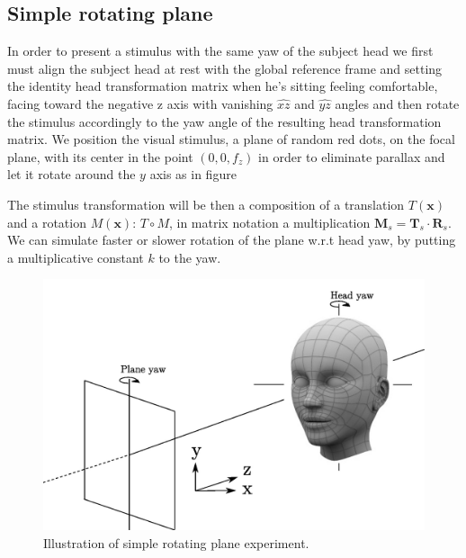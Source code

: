 \documentclass[acmtocl,acmnow]{acmtrans2m}
\begin{document}
\subsection{Simple rotating plane}
In order to present a stimulus with the same yaw of the subject head we first must align the subject head at rest with the global reference frame and setting the identity head transformation matrix 
when he's sitting feeling comfortable, facing toward the negative z axis with vanishing $\hat{xz}$ and $\hat{yz}$ angles and then rotate the stimulus accordingly to the yaw angle of the resulting head transformation matrix.
We position the visual stimulus, a plane of random red dots, on the focal plane, with its center in the point $(0,0,f_z)$ in order to eliminate parallax and let it rotate around the $y$ axis as in figure 

The stimulus transformation will be then a composition of a translation $T(\mathbf{x})$ and a rotation $M(\mathbf{x})$: $T \circ M$, in matrix notation a multiplication $\mathbf{M}_s = \mathbf{T}_s \cdot \mathbf{R}_s$.
We can simulate faster or slower rotation of the plane w.r.t head yaw, by putting a multiplicative constant $k$ to the yaw.
\begin{figure}[htb]
\label{fig:planeyaw}
\caption{Illustration of simple rotating plane experiment.}
 \includegraphics[bb=0 0 269 177]{images/planeyaw.jpg}
\end{figure}
\end{document}
